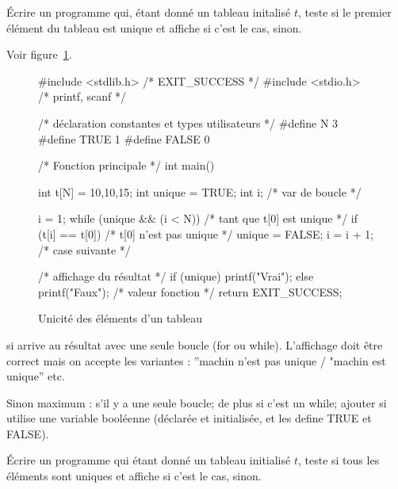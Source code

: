 \question Écrire un programme qui, étant donné un tableau initalisé $t$,
  teste si le premier élément du tableau est unique et affiche
   si c'est le cas,  sinon.
  \begin{correction} 
Voir figure~\ref{fig:unicite1}.
    \begin{figure}[htbp]
      \begin{small}
        \begin{listing}{1}
#include <stdlib.h> /* EXIT_SUCCESS */
#include <stdio.h> /* printf, scanf */

/* déclaration constantes et types utilisateurs */
#define N 3
#define TRUE 1
#define FALSE 0

/* Fonction principale */
int main()
{
  int t[N] = {10,10,15};
  int unique = TRUE;
  int i; /* var de boucle */

  i = 1;
  while (unique && (i < N)) /* tant que t[0] est unique */
  {
    if (t[i] == t[0]) /* t[0] n'est pas unique */
    {
      unique = FALSE;
    }
    i = i + 1; /* case suivante */
  }

  /* affichage du résultat */
  if (unique)
  {
    printf("Vrai\n");
  }
  else
  {
    printf("Faux\n");
  }
  /* valeur fonction */
  return EXIT_SUCCESS;
}
\end{listing}
      \end{small}
      \caption{Unicité des éléments d'un tableau}
      \label{fig:unicite1}
    \end{figure}

    \begin{baremeenv}
     si arrive au résultat avec une seule boucle (for ou
    while). L'affichage doit être correct mais on accepte les
    variantes : ''machin n'est
    pas unique / "machin est unique'' etc.

    Sinon maximum  :  s'il y a une seule boucle; 
    de plus si c'est un while; ajouter  si utilise une
    variable booléenne (déclarée et initialisée, et les define TRUE
    et FALSE).      
    \end{baremeenv}
  \end{correction}


\question Écrire un programme qui étant donné un tableau initialisé $t$, teste
  si tous les éléments sont uniques et affiche  si c'est le
  cas,  sinon.

